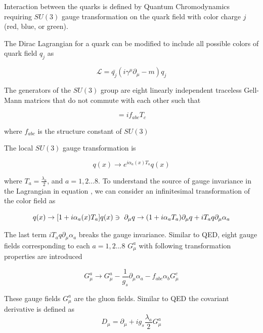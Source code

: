 Interaction between the quarks is defined by Quantum Chromodynamics requiring $SU(3)$ gauge transformation on the quark field with color charge $j$ (red, blue, or green).
 
The Dirac Lagrangian for a quark can be modified to include all possible colors of quark field $q_{j}$ as

\begin{equation}
\mathcal{L} = \bar{q_{j}}(i\gamma^{\mu}\partial_{\mu} - m )q_{j}
\label{eqn:QCDStartL}
\end{equation}

The generators of the $SU(3)$ group are eight linearly independent traceless Gell-Mann matrices that do not commute with each other such that 

\begin{equation}
[ T_{a},T_{b} ] = if_{abc}T_{c}
\label{eqn:SU3GellManMat}
\end{equation}

where $f_{abc}$ is the structure constant of $SU(3)$

The local $SU(3)$ gauge transformation is 

\begin{equation}
q(x) \rightarrow e^{i \alpha_a(x) T_{a}} q(x)
\label{eqn:QCDSU3LT}
\end{equation}

where $T_{a} = \frac{\lambda_{a}}{2}$, and $a = {1,2...8}$. To understand the source of gauge invariance in the Lagrangian in equation \label{eqn:SU3LocalGaugeTransform}, we can consider an infinitesimal transformation of the color field as 

\begin{equation}
q(x) \rightarrow [ 1 + i\alpha_{a}(x)T_{a}]q(x) \\
\ni ~ \partial_{\mu}q \rightarrow ( 1 + i\alpha_{a}T_{a})\partial_{\mu}q + iT_{a}q\partial_{\mu} \alpha_{a}
\end{equation}

The last term $iT_{a}q\partial_{\mu} \alpha_{a}$ breaks the gauge invariance. Similar to QED, eight gauge fields corresponding to each $a = {1,2...8}$ $G_{\mu}^{a}$ with following transformation properties are introduced 

\begin{equation}
G_{\mu}^{a} \rightarrow G_{\mu}^{a} - \frac{1}{g_{s}} \partial_{\mu} \alpha_{a} - f_{abc}\alpha_{b}G^{c}_{\mu}
\label{eqn:SU3GaugeField}
\end{equation}

These gauge fields $G_{\mu}^{a}$ are the gluon fields. Similar to QED the covariant derivative is defined as
\begin{equation}
D_{\mu} = \partial_{\mu} + ig_{s}\frac{\lambda_{a}}{2}G_{\mu}^{a} 
\label{eqn:SU3CovDerv}
\end{equation}

